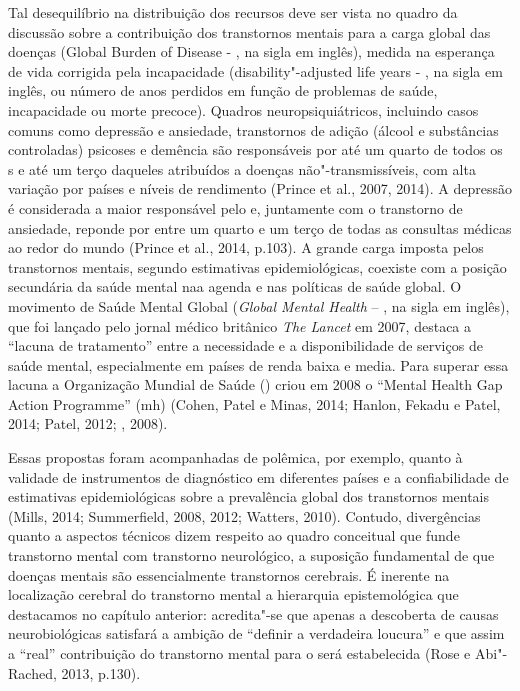 Tal desequilíbrio na distribuição dos recursos deve ser vista no quadro
da discussão sobre a contribuição dos transtornos mentais para a carga
global das doenças (Global Burden of Disease - , na sigla em inglês),
medida na esperança de vida corrigida pela incapacidade
(disability"-adjusted life years - , na sigla em inglês, ou número
de anos perdidos em função de problemas de saúde, incapacidade ou morte
precoce). Quadros neuropsiquiátricos, incluindo casos comuns como
depressão e ansiedade, transtornos de adição (álcool e substâncias
controladas) psicoses e demência são responsáveis por até um quarto de
todos os s e até um terço daqueles atribuídos a doenças
não"-transmissíveis, com alta variação por países e níveis de rendimento
(Prince et al., 2007, 2014). A depressão é considerada a maior
responsável pelo  e, juntamente com o transtorno de ansiedade,
reponde por entre um quarto e um terço de todas as consultas médicas ao
redor do mundo (Prince et al., 2014, p.103). A grande carga imposta
pelos transtornos mentais, segundo estimativas epidemiológicas, coexiste
com a posição secundária da saúde mental naa agenda e nas políticas de
saúde global. O movimento de Saúde Mental Global (\emph{Global Mental
Health} -- , na sigla em inglês), que foi lançado pelo jornal médico
britânico \emph{The Lancet} em 2007, destaca a ``lacuna de tratamento''
entre a necessidade e a disponibilidade de serviços de saúde mental,
especialmente em países de renda baixa e media. Para superar essa lacuna
a Organização Mundial de Saúde () criou em 2008 o ``Mental Health Gap
Action Programme'' (mh) (Cohen, Patel e Minas, 2014; Hanlon, Fekadu e
Patel, 2014; Patel, 2012; , 2008).

Essas propostas foram acompanhadas de polêmica, por exemplo, quanto à
validade de instrumentos de diagnóstico em diferentes países e a
confiabilidade de estimativas epidemiológicas sobre a prevalência global
dos transtornos mentais (Mills, 2014; Summerfield, 2008, 2012; Watters,
2010). Contudo, divergências quanto a aspectos técnicos dizem respeito
ao quadro conceitual que funde transtorno mental com transtorno
neurológico, a suposição fundamental de que doenças mentais são
essencialmente transtornos cerebrais. É inerente na localização cerebral
do transtorno mental a hierarquia epistemológica que destacamos no
capítulo anterior: acredita"-se que apenas a descoberta de causas
neurobiológicas satisfará a ambição de ``definir a verdadeira loucura''
e que assim a ``real'' contribuição do transtorno mental para o  será
estabelecida (Rose e Abi"-Rached, 2013, p.130).


